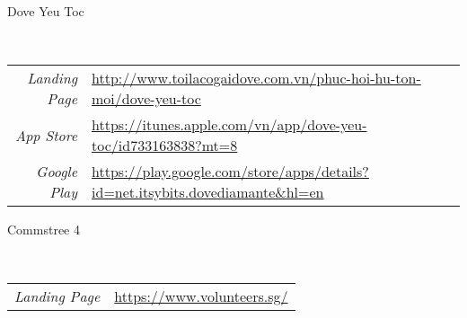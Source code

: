\documentclass[a4paper,10pt]{article}
\begin{document}
\hfill
\par{\centering\Large \hypertarget{dove-links}{Dove Yeu Toc}\par}
\hrulefill\\
\newline
\begin{tabular}{rl}
    \textit{Landing Page} & \url{http://www.toilacogaidove.com.vn/phuc-hoi-hu-ton-moi/dove-yeu-toc}\\
    \textit{App Store} & \small \url{https://itunes.apple.com/vn/app/dove-yeu-toc/id733163838?mt=8}\\
    \textit{Google Play} & \small \url{https://play.google.com/store/apps/details?id=net.itsybits.dovediamante&hl=en}
\end{tabular}

\hfill
\par{\centering\Large \hypertarget{ct-links}{Commstree 4}\par}
\hrulefill\\
\newline
\begin{tabular}{rl}
    \textit{Landing Page} & \url{https://www.volunteers.sg/}\\
\end{tabular}



\end{document}
